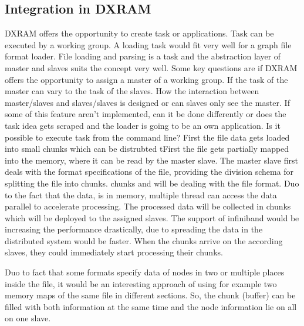 \subsection{Integration in DXRAM}
DXRAM offers the opportunity to create task or applications. Task can be executed by a working group. A loading task would fit very well for a graph file format loader. File loading and parsing is a task and the abstraction layer of master and slaves suits the concept very well.
Some key questions are if DXRAM offers the opportunity to assign a master of a working group. If the task of the master can vary to the task of the slaves. How the interaction between master/slaves and slaves/slaves is designed or can slaves only see the master.
If some of this feature aren’t implemented, can it be done differently or does the task idea gets scraped and the loader is going to be an own application. Is it possible to execute task from the command line?
First the file data gets loaded into small chunks which can be distrubted tFirst the file gets partially mapped into the memory, where it can be read by the master slave. The master slave first deals with the format specifications of the file, providing the division schema for splitting the file into chunks. chunks and will be dealing with the file format. Duo to the fact that the data, is in memory, multiple thread can access the data parallel to accelerate processing. The processed data will be collected in chunks which will be deployed to the assigned slaves.
The support of infiniband would be increasing the performance drastically, due to spreading the data in the distributed system would be faster.
When the chunks arrive on the according slaves, they could immediately start processing their chunks.
 
Duo to fact that some formats specify data of nodes in two or multiple places inside the file, it would be an interesting approach of using for example two memory maps of the same file in different sections. So, the chunk (buffer) can be filled with both information at the same time and the node information lie on all on one slave.


